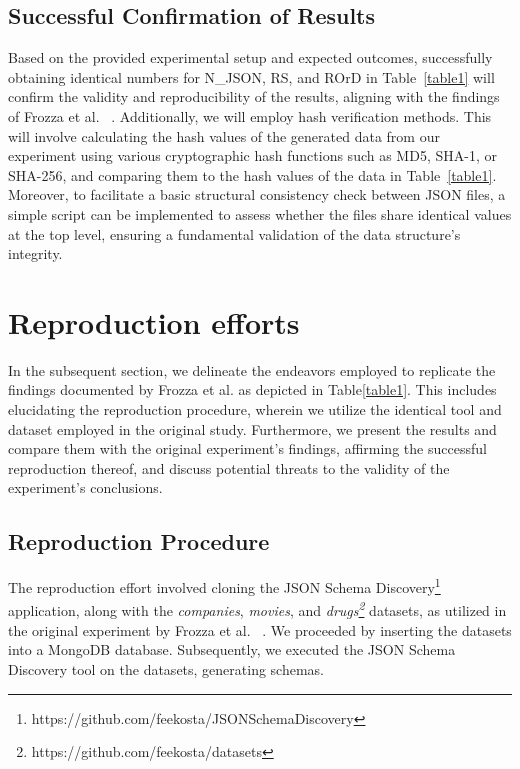 \documentclass[sigconf, nonacm]{acmart}
\begin{document}
\subsection{Successful Confirmation of Results}

Based on the provided experimental setup and expected outcomes, successfully obtaining identical numbers for N\_JSON, RS, and ROrD in Table~\ref{table1} will confirm the validity and reproducibility of the results, aligning with the findings of Frozza et al. ~\cite{frozza2018approach}. Additionally, we will employ hash verification methods. This will involve calculating the hash values of the generated data from our experiment using various cryptographic hash functions such as MD5, SHA-1, or SHA-256, and comparing them to the hash values of the data in Table~\ref{table1}. Moreover, to facilitate a basic structural consistency check between JSON files, a simple script can be implemented to assess whether the files share identical values at the top level, ensuring a fundamental validation of the data structure’s integrity.


\newpage


\section{Reproduction efforts}

In the subsequent section, we delineate the endeavors employed to replicate the findings documented by Frozza et al. \cite{frozza2018approach} as depicted in Table\ref{table1}. This includes elucidating the reproduction procedure, wherein we utilize the identical tool and dataset employed in the original study. Furthermore, we present the results and compare them with the original experiment's findings, affirming the successful reproduction thereof, and discuss potential threats to the validity of the experiment's conclusions.


\subsection{Reproduction Procedure}
The reproduction effort involved cloning the JSON Schema Discovery\footnote{https://github.com/feekosta/JSONSchemaDiscovery} application, along with the \textit{companies}, \textit{movies}, and \textit{drugs\footnote{https://github.com/feekosta/datasets}} datasets, as utilized in the original experiment by Frozza et al. ~\cite{frozza2018approach}. We proceeded by inserting the datasets into a MongoDB database. Subsequently, we executed the JSON Schema Discovery tool on the datasets, generating schemas. 
\end{document}
